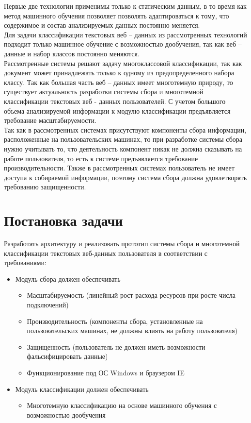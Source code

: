 \documentclass[russian, utf8, emptystyle]{eskdtext}
\begin{document}
Первые две технологии применимы только к статическим данным, в то время как метод машинного обучения позволяет позволять адаптироваться к тому, что содержимое и состав анализируемых данных постоянно меняется.\\
Для задачи классификации текстовых веб – данных из рассмотренных технологий подходит только машинное обучение с возможностью дообучения, так как веб – данные и набор классов постоянно меняются. \\
Рассмотренные системы решают задачу многоклассовой классификации, так как документ может принадлежать только к одному из предопределенного набора классу. Так как большая часть веб – данных имеет многотемную природу, то существует актуальность разработки системы сбора и многотемной классификации текстовых веб - данных пользователей. С учетом большого объема анализируемой информации к модулю классификации предъявляется требование масштабируемости. \\

Так как в рассмотренных системах присутствуют компоненты сбора информации, расположенные на пользовательских машинах, то при разработке системы сбора нужно учитывать то, что деятельность компонент никак не должна сказывать на работе пользователя, то есть к системе предъявляется требование производительности. Также в рассмотренных системах пользователь не имеет доступа к собираемой информации, поэтому система сбора должна удовлетворять требованию защищенности.
\section{Постановка задачи}
Разработать архитектуру и реализовать прототип системы сбора и многотемной классификации текстовых веб-данных пользователя в соответствии  с требованиями:
\begin{itemize}
	\item Модуль сбора должен обеспечивать
	\begin{itemize}
		\item Масштабируемость (линейный рост расхода ресурсов при росте числа подключений)
		\item Производительность (компоненты сбора, установленные на пользовательских машинах, не должны влиять на работу пользователя)
		\item Защищенность (пользователь не должен иметь возможности фальсифицировать данные)
		\item Функционирование под ОС Windows и браузером IE 
	\end{itemize}
	\item Модуль классификации должен обеспечивать
		\begin{itemize}
			\item Многотемную классификацию на основе машинного обучения с возможностью дообучения
		\end{itemize}
\end{itemize}
\end{document}
